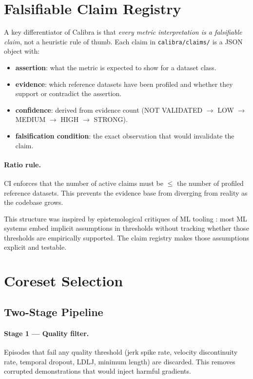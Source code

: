 \documentclass[10pt,twocolumn]{article}
\begin{document}
\section{Falsifiable Claim Registry}
\label{sec:claims}

A key differentiator of Calibra is that \emph{every metric interpretation is
a falsifiable claim}, not a heuristic rule of thumb.
Each claim in \texttt{calibra/claims/} is a JSON object with:

\begin{itemize}[nosep]
  \item \textbf{assertion}: what the metric is expected to show for a dataset class.
  \item \textbf{evidence}: which reference datasets have been profiled and
    whether they support or contradict the assertion.
  \item \textbf{confidence}: derived from evidence count (NOT VALIDATED $\to$
    LOW $\to$ MEDIUM $\to$ HIGH $\to$ STRONG).
  \item \textbf{falsification condition}: the exact observation that would
    invalidate the claim.
\end{itemize}

\paragraph{Ratio rule.}
CI enforces that the number of active claims must be $\leq$ the number of
profiled reference datasets. This prevents the evidence base from diverging
from reality as the codebase grows.

This structure was inspired by epistemological critiques of ML tooling
\citep{sculley2015hidden}: most ML systems embed implicit assumptions in
thresholds without tracking whether those thresholds are empirically supported.
The claim registry makes those assumptions explicit and testable.

\section{Coreset Selection}
\label{sec:coreset}

\subsection{Two-Stage Pipeline}

\paragraph{Stage 1 --- Quality filter.}
Episodes that fail any quality threshold (jerk spike rate, velocity
discontinuity rate, temporal dropout, LDLJ, minimum length) are discarded.
This removes corrupted demonstrations that would inject harmful gradients.
\end{document}
